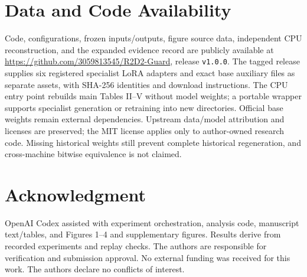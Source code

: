 \documentclass[journal]{IEEEtran}
\begin{document}
\section*{Data and Code Availability}
Code, configurations, frozen inputs/outputs, figure source data, independent CPU reconstruction, and the expanded evidence record are publicly available at \url{https://github.com/3059813545/R2D2-Guard}, release \texttt{v1.0.0}. The tagged release supplies six registered specialist LoRA adapters and exact base auxiliary files as separate assets, with SHA-256 identities and download instructions. The CPU entry point rebuilds main Tables II--V without model weights; a portable wrapper supports specialist generation or retraining into new directories. Official base weights remain external dependencies. Upstream data/model attribution and licenses are preserved; the MIT license applies only to author-owned research code. Missing historical weights still prevent complete historical regeneration, and cross-machine bitwise equivalence is not claimed.

\section*{Acknowledgment}
OpenAI Codex assisted with experiment orchestration, analysis code, manuscript text/tables, and Figures 1--4 and supplementary figures. Results derive from recorded experiments and replay checks. The authors are responsible for verification and submission approval. No external funding was received for this work. The authors declare no conflicts of interest.
\end{document}
